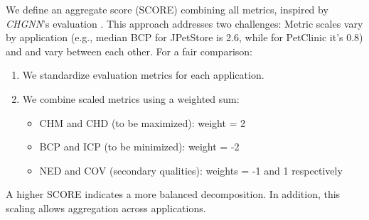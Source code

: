 We define an aggregate score (SCORE) combining all metrics, inspired by \textit{CHGNN}'s evaluation \cite{mathai2022chgnn}. This approach addresses two challenges: Metric scales vary by application (e.g., median BCP for JPetStore is 2.6, while for PetClinic it's 0.8) and and vary between each other. For a fair comparison:
\begin{enumerate}

\item We standardize evaluation metrics for each application.
\item We combine scaled metrics using a weighted sum:
\begin{itemize}

\item CHM and CHD (to be maximized): weight = 2
\item BCP and ICP (to be minimized): weight = -2
\item NED and COV (secondary qualities): weights = -1 and 1 respectively
\end{itemize}
\end{enumerate}



A higher SCORE indicates a more balanced decomposition. In addition, this scaling allows aggregation across applications.



